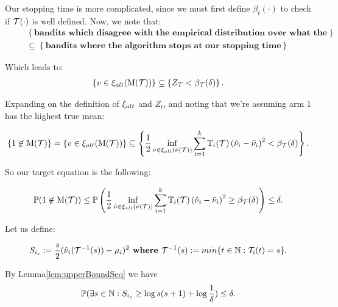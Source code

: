 Our stopping time is more complicated, since we must first define $\beta_t(\cdot)$ to check if $\mathcal{T}(\cdot)$ is well defined. Now, we note that:
\begin{align*}
&\mathrel{\phantom{=}}\left\{\textbf{bandits which disagree with the empirical distribution over what the best arm is} \right\} \\
&\mathrel{\phantom{=}}\subseteq \left\{\textbf{bandits where the algorithm stops at our stopping time}\right\}
\end{align*}

Which leads to:
\begin{align}
\left\{ v \in \xi_{alt}(\mathrm{M}({\mathcal{T}})) \right\} \subseteq \left\{ Z_{\mathcal{T}} < \beta_{\mathcal{T}}(\delta)\right\}.
\end{align}

Expanding on the definition of $\xi_{alt}$ and $Z_t$, and noting that we're assuming arm 1 has the highest true mean:

\begin{align}
\left\{ 1 \not\in \mathrm{M}({\mathcal{T}}) \right\} = \left\{ v \in \xi_{alt}(\mathrm{M}({\mathcal{T}})) \right\} \subseteq \left\{ \frac{1}{2}\inf\limits_{\bar{\nu} \in \xi_{alt}(\hat{\nu}(\mathcal{T}))} \sum_{i=1}^k \mathbb{T}_{i}(\mathcal{T}) \left( \hat{\nu}_i - \bar{\nu}_i \right)^2 < \beta_{\mathcal{T}}(\delta)\right\}.
\end{align}

So our target equation is the following:

\label{tar:track-and-stop}
\begin{align}
\mathbb{P}( 1 \not\in \mathrm{M}({\mathcal{T}})) \leq \mathbb{P}\left( \frac{1}{2}\inf\limits_{\bar{\nu} \in \xi_{alt}(\hat{\nu}(\mathcal{T}))} \sum_{i=1}^k \mathbb{T}_{i}(\mathcal{T}) \left( \hat{\nu}_i - \bar{\nu}_i \right)^2 \geq \beta_{\mathcal{T}}(\delta)\right) \leq \delta.
\end{align}

\seperator

Let us define:

\begin{align*}
S_{i_s} := \frac{s}{2}(\hat{\nu}_{i}(\mathcal{T}^{-1}(s)) - \mu_{i})^2 \textbf{ where } \mathcal{T}^{-1}(s) := min \{ t \in \mathbb{N} : \mathcal{T}_{i}(t) = s \}.
\end{align*}

By Lemma\ref{lem:upperBoundSeq} we have
\begin{align*}
\mathbb{P}(\exists s \in \mathbb{N} : S_{i_s} \geq \log{s(s+1)} + \log{\frac{1}{\delta}}) \leq \delta.
\end{align*}

